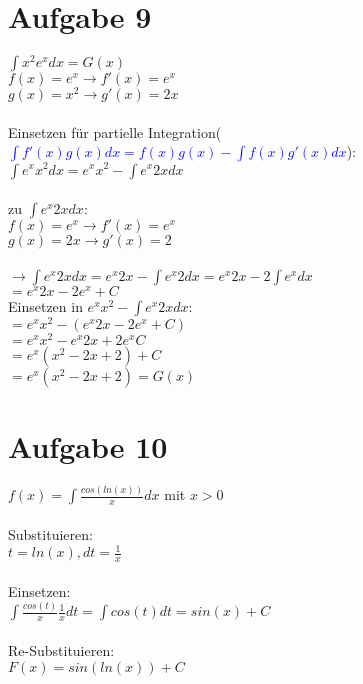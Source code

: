 \documentclass[12pt,a4paper]{article}
\begin{document}
\section*{Aufgabe 9}
$\int x^2e^xdx=G(x)$\\
$f(x) =e^x\rightarrow f'(x)=e^x$\\
$g(x) =x^2\rightarrow g'(x)=2x$\\
\\
Einsetzen für partielle Integration(\textcolor{blue}{$\int f'(x)g(x)dx=f(x)g(x)-\int f(x)g'(x)dx$}):\\
$\int e^xx^2dx=e^xx^2-\int e^x2x dx$\\
\\
zu $\int e^x2xdx$:\\
$f(x) =e^x\rightarrow f'(x)=e^x$\\
$g(x) =2x\rightarrow g'(x)=2$\\
\\
$\rightarrow \int e^x2x dx = e^x2x-\int e^x2dx = e^x2x-2\int e^x dx$\\
$=e^x2x-2e^x+C$\\
Einsetzen in $e^xx^2-\int e^x2x dx$:\\
$= e^xx^2-(e^x2x-2e^x+C)$\\$= e^xx^2-e^x2x+2e^xC$\\$= e^x(x^2-2x+2)+C$\\\underline{$=e^x(x^2-2x+2) = G(x)$}\\
\section*{Aufgabe 10}
$f(x)=\int \frac{cos(ln(x))}{x}dx$ mit $x>0$\\
\\
Substituieren:\\
$t=ln(x),dt=\frac{1}{x}$\\
\\
Einsetzen:\\
$\int \frac{cos(t)}{x}\frac{1}{x}dt=\int cos(t) dt=sin(x)+C$\\
\\
Re-Substituieren:\\
$F(x)=sin(ln(x))+C$
\end{document}

